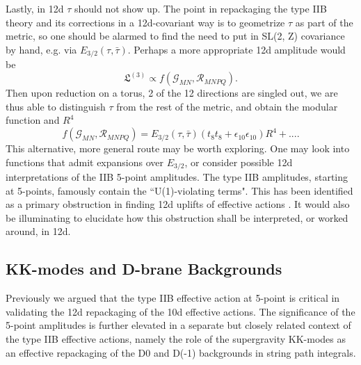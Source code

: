 Lastly, in 12d $\tau$ should not show up. 
The point in repackaging the type IIB theory and its corrections in a 12d-covariant way is to geometrize $\tau$ as part of the metric, so one should be alarmed to find the need to put in SL(2, Z) covariance by hand, e.g. via $E_{3/2}(\tau,\bar\tau)$.
Perhaps a more appropriate 12d amplitude would be
\begin{equation}
\mathfrak{L}^{(3)} \propto f(\mathcal G_{MN},\mathcal R_{MNPQ}).
\end{equation}
Then upon reduction on a torus, 2 of the 12 directions are singled out, we are thus able to distinguish $\tau$ from the rest of the metric, and obtain the modular function and $R^4$
\begin{equation}
f(\mathcal G_{MN},\mathcal R_{MNPQ})
= E_{3/2}(\tau,\bar\tau)(t_8t_8 + \epsilon_{10}\epsilon_{10})R^4 + ....
\end{equation}
This alternative, more general route may be worth exploring.
One may look into functions that admit expansions over $E_{3/2}$, or consider possible 12d interpretations of the IIB 5-point amplitudes.
The type IIB amplitudes, starting at 5-points, famously contain the ``U(1)-violating terms". This has been identified as a primary obstruction in finding 12d uplifts of effective actions \cite{Liu:2025uqu}.
It would also be illuminating to elucidate how this obstruction shall be interpreted, or worked around, in 12d.






\subsection{KK-modes and D-brane Backgrounds}
Previously we argued that the type IIB effective action at 5-point is critical in validating the 12d repackaging of the 10d effective actions.
The significance of the 5-point amplitudes is further elevated in a separate but closely related context of the type IIB effective actions, namely the role of the supergravity KK-modes as an effective repackaging of the D0 and D(-1) backgrounds in string path integrals. 

